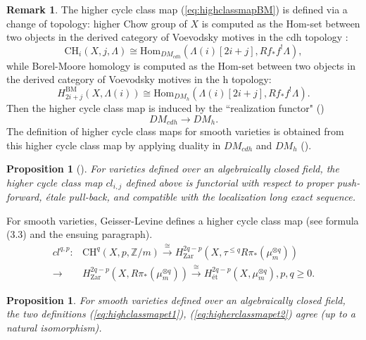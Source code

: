 \documentclass{amsart}
\newtheorem{prop}[theorem]{Proposition}
\theoremstyle{definition}
\newtheorem{rem}[theorem]{Remark}
\theoremstyle{remark}
\newcommand{\mbb}{\mathbb}
\newcommand{\ZZ}{\mbb{Z}}
\newcommand{\et}{\text{\'et}}
\begin{document}
\begin{rem}\label{rem:class}
    The higher cycle class map (\ref{eq:highclassmapBM}) is defined via a change of topology: higher Chow group of $X$ is computed as the Hom-set between two objects in the derived category of Voevodsky motives in the cdh topology \cite[Proposition 4.1]{kok_Zhou}:
\[
\text{CH}_i(X, j, \Lambda)\cong \text{Hom}_{DM_{cdh}}(\Lambda(i)[2i+j], Rf_*f^!\Lambda),
\]
 while Borel-Moore homology is computed as the Hom-set between two objects in the derived category of Voevodsky motives in the h topology:
\[
H_{2i+j}^{\text{BM}}(X, \Lambda(i))\cong \text{Hom}_{DM_{h}}(\Lambda(i)[2i+j], Rf_*f^!\Lambda).
\] 
Then the higher cycle class map is induced by the ``realization functor" (\cite[9.1.1]{Cisinski_Deglise_mix_motive})
\[
DM_{cdh} \to DM_h.
\]
 The definition of higher cycle class maps for smooth varieties is obtained from this higher cycle class map by applying duality in $DM_{cdh}$ and $DM_h$ (\cite[Definition 4.2]{kok_Zhou}).
\end{rem}



\begin{prop}[{\cite[Proposition 4.3]{kok_Zhou}}]\label{prop:func}
    For varieties defined over an algebraically closed field, the higher cycle class map $cl_{i, j}$ defined above is functorial with respect to proper push-forward, \'etale pull-back, and compatible with the localization long exact sequence.
\end{prop}


For smooth varieties,  Geisser-Levine defines a higher cycle class map \cite{Geisser_Levine}(see formula (3.3) and the ensuing paragraph).
\begin{align}\label{eq:higherclassmapet2}
    cl^{q, p}: &\text{CH}^q(X, p, \ZZ/m) \xrightarrow{\cong} H_{\text{Zar}}^{2q-p}(X, \tau^{\leq q}R\pi_*(\mu_m^{\otimes q}))\\ 
    \to &H_{\text{Zar}}^{2q-p}(X, R\pi_*(\mu_m^{\otimes q}))\xrightarrow{\cong} H^{2q-p}_\et(X, \mu_m^{\otimes q}), p, q\geq 0.\nonumber
\end{align}
\begin{prop}\cite[Proposition 4.4]{kok_Zhou}
    For smooth varieties defined over an algebraically closed field, the two definitions (\ref{eq:highclassmapet1}), (\ref{eq:higherclassmapet2}) agree (up to a natural isomorphism).
\end{prop}
\end{document}
